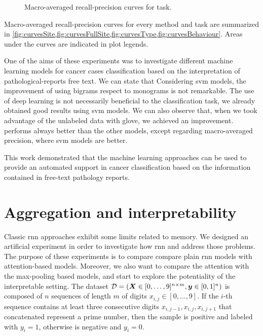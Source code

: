 \begin{figure}
  \centering
  \resizebox{0.9\textwidth}{!}{}
  \caption{Macro-averaged recall-precision curves for \behaviour{} task.}
  \label{fig:curvesBehaviour}
\end{figure}

Macro-averaged recall-precision curves for every method and task are
summarized in
\cref{fig:curvesSite,fig:curvesFullSite,fig:curvesType,fig:curvesBehaviour}. Areas
under the curves are indicated in 
plot legends.

One of the aims of these experiments was to investigate different
machine learning 
models for cancer cases classification based on the interpretation
of pathological-reports free text. We can state that
Considering \ac{svm} models, the improvement of using
bigrams respect to monograms is not remarkable.
The use of deep learning is not necessarily beneficial to the
classification task, we already obtained good results using \ac{svm}
models. We can also observe that, when we took 
advantage of the unlabeled data with \ac{glove}, we achieved an
improvement.
\lstmb{} performs always better than the other models, except
regarding macro-averaged precision, where \ac{svm} models are better.

This work demonstrated that the machine learning approaches can be
used to provide an automated support in cancer classification based on
the information contained in free-text pathology reports.

\section{Aggregation and interpretability}
\label{ch:artificial}

Classic \ac{rnn} approaches exhibit some limits related to
memory. We designed an artificial experiment in
order to investigate how \ac{rnn} and \maxp{} address those
problems. The purpose of these experiments is to compare compare plain
\ac{rnn} models with attention-based models. Moreover, we also want to
compare the attention with the max-pooling based models, and start to
explore the potentiality of the interpretable setting. The dataset 
$\mathcal{D}=(\bm{X}\in [0,\dots,9]^{n\times m},\bm{y}\in [0,1]^n)$ is
composed of $n$ sequences of length
$m$ of digits $x_{i,j}\in[0,\dots,9]$. If the $i$-th sequence contains
at least three consecutive digits
$x_{i,j-1},x_{i,j},x_{i,j+1}$ that concatenated represent a prime
number, then the
sample is positive and labeled with $y_i=1$, otherwise is negative and
$y_i=0$.

